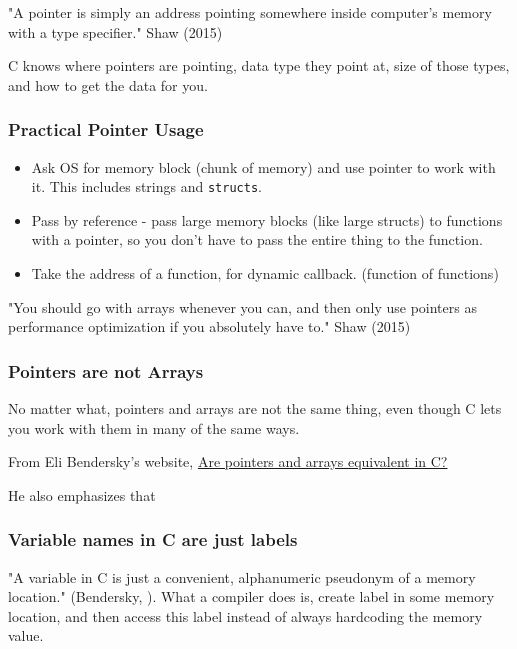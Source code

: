 \documentclass[10pt]{amsart}
\begin{document}
\begin{multicols*}{2}
"A pointer is simply an address pointing somewhere inside computer's memory with a type specifier."  Shaw (2015) \cite{Shaw2015}


C knows where pointers are pointing, data type they point at, size of those types, and how to get the data for you.  

\subsubsection{Practical Pointer Usage}
\begin{itemize}
	\item Ask OS for memory block (chunk of memory) and use pointer to work with it.  This includes strings and \verb|structs|.  
	\item Pass by reference - pass large memory blocks (like large structs) to functions with a pointer, so you don't have to pass the entire thing to the function.  
	\item Take the address of a function, for dynamic callback. (function of functions)
\end{itemize}

"You should go with arrays whenever you can, and then only use pointers as performance optimization if you absolutely have to."  Shaw (2015) \cite{Shaw2015}

\subsubsection{Pointers are not Arrays}  

No matter what, pointers and arrays are not the same thing, even though C lets you work with them in many of the same ways.  

From Eli Bendersky's website, \href{https://eli.thegreenplace.net/2009/10/21/are-pointers-and-arrays-equivalent-in-c}{Are pointers and arrays equivalent in C?}

He also emphasizes that 

\subsubsection{Variable names in C are just labels}  

"A variable in C is just a convenient, alphanumeric pseudonym of a memory location." (Bendersky, \cite{Bend}).  What a compiler does is, create label in some memory location, and then access this label instead of always hardcoding the memory value.   


\end{multicols*}
\end{document}
